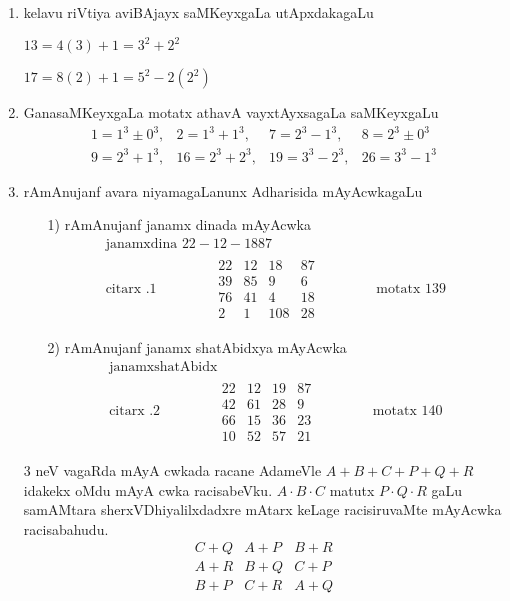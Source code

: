 \begin{enumerate}[{\rm I}]
\item kelavu riVtiya aviBAjayx saMKeyxgaLa utApxdakagaLu

$13=4(3)+1 = 3^{2}+2^{2}$

$17=8(2)+1 = 5^{2}-2(2^{2})$
\item GanasaMKeyxgaLa motatx athavA vayxtAyxsagaLa saMKeyxgaLu
$$
\begin{matrix}
1=1^3\pm 0^3, & 2=1^3+1^3, & 7= 2^3-1^3, & 8= 2^3\pm 0^3\\[4pt]
9=2^3+1^3, & 16=2^3+2^3, & 19=3^3-2^3, & 26=3^3-1^3 
\end{matrix}
$$

\newpage

\item rAmAnujanf avara niyamagaLanunx Adharisida mAyAcwkagaLu
\begin{itemize}
\item[{\rm 1)}] rAmAnujanf janamx dinada mAyAcwka
\begin{gather*}
\text{janamxdina } 22-12-1887\\
\text{citarx~.} 1 \qquad \qquad 
\begin{matrix}
22 & 12 & 18 & 87\\
39 & 85 & 9 & 6\\
76 & 41 & 4 & 18\\
2 & 1 & 108 & 28
\end{matrix} \qquad \qquad
\text{motatx } 139
\end{gather*}

\item[{\rm 2)}] rAmAnujanf janamx shatAbidxya mAyAcwka
\begin{gather*}
\text{janamxshatAbidx }\\
\text{citarx~.} 2 \qquad \qquad 
\begin{matrix}
22 & 12 & 19 & 87\\
42 & 61 & 28 & 9\\
66 & 15 & 36 & 23\\
10 & 52 & 57 & 21
\end{matrix} \qquad \qquad 
\text{motatx } 140
\end{gather*}
\end{itemize}

{\rm 3} neV vagaRda mAyA cwkada racane AdameVle $A+B+C+P+Q+R$ idakekx oMdu mAyA cwka racisabeVku. $A\cdot B\cdot C$ matutx $P\cdot Q\cdot R$ gaLu samAMtara sherxVDhiyalilxdadxre mAtarx keLage racisiruvaMte mAyAcwka racisabahudu.
$$
\begin{matrix}
C+Q & A+P & B+R\\
A+R & B+Q & C+P\\
B+P & C+R & A+Q
\end{matrix}
$$
 

\end{enumerate}
